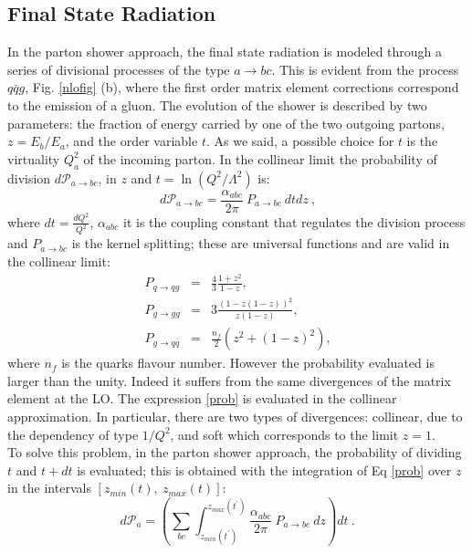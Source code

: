 \subsection*{Final State Radiation}
In the parton shower approach, the final state radiation  is modeled through a series of divisional processes of the type $ a \rightarrow bc $.   
This is evident from the process $q \bar{q}g$, Fig. \ref{nlofig} (b), where the first order matrix element  corrections  correspond to the emission of a gluon. 
The evolution of the shower is described by two parameters: the fraction of energy carried by one of the two outgoing partons, $ z = E_b / E_a $, and the order variable $ t $. As we said, a possible choice for $ t $ is the  virtuality $ Q_a^2 $ of the incoming parton.
In the  collinear limit the probability of division $d \mathcal{P}_{a \rightarrow bc}$, in  $z$ and $t=\ln(Q^2/\Lambda^2)$ is:
\begin{equation}
 d \mathcal{P}_{a \rightarrow bc}=  \frac{\alpha_{abc}}{2 \pi}\: {P}_{a \rightarrow bc} \:dt dz  \: \mbox{,} \label{prob}  \end{equation}
where $dt=\frac{d Q^2}{Q^2}$, $\alpha_{abc}$ it is the coupling constant that regulates the division process and  ${P}_{a \rightarrow bc}$ is the kernel splitting; these are universal functions and are valid in the collinear limit:
\begin{eqnarray}
P_{q \rightarrow qg    }&=& \frac{4}{3} \frac{1+z^2}{1-z} \mbox{,} \nonumber \\ 
 P_{g \rightarrow gg }&=& 3 \frac{(1-z(1-z))^2}{z(1-z)}    \mbox{,} \\ 
P_{g \rightarrow q\bar{q} }&=& \frac{n_f}{2} (z^2+ (1-z)^2)   \mbox{,} \nonumber \end{eqnarray}
where $n_f$ is the quarks flavour number.
However the probability  evaluated is larger than the unity. Indeed it suffers from the same divergences of the matrix element at the LO. 
The expression \ref{prob} is evaluated in the collinear approximation. 
In particular, there are two types of divergences: collinear, due to the dependency of type $ 1 / Q^2 $, and soft which corresponds to the limit $ z = 1 $. \\
To solve this problem, in the parton shower approach, the probability of dividing $ t $ and $ t + dt $ is evaluated; this is obtained with the integration of Eq \ref{prob} over  $z$ in the intervals  $[z_{min}(t), \: z_{max}(t)]$:
\begin{equation}
 d \mathcal{P}_{a}= \left( \sum_{bc} \int_{z_{min}(t^{'})}^{{z_{max}(t^{'})}}  \frac{\alpha_{abc}}{2 \pi}\: {P}_{a \rightarrow bc} \: dz \right) dt  \: \mbox{.}   \end{equation}
